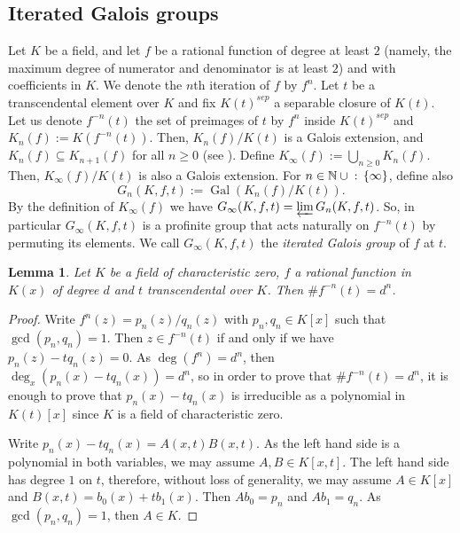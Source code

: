 \documentclass{amsart}
\def\set#1{{\def\st{\;:\;}\left\{#1\right\}}}
\def\NN{\mathbb N}
\DeclareMathOperator{\Gal}{Gal}
\DeclareMathOperator{\st}{st}
\newtheorem{Lemma}[Proposition]{Lemma}
\begin{document}
\subsection{Iterated Galois groups}
\label{subsection: The galois of iterated rational functions}

Let $K$ be a field, and let $f$ be a rational function of degree at least $2$ (namely, the maximum degree of numerator and denominator is at least $2$) and with coefficients in $K$. We denote the $n$th iteration of $f$ by $f^n$. Let $t$ be a transcendental element over $K$ and fix $K(t)^{sep}$ a separable closure of $K(t)$. Let us denote $f^{-n}(t)$ the set of preimages of $t$ by $f^n$ inside $K(t)^{sep}$ and $K_n(f) := K(f^{-n}(t))$. Then, $K_n(f)/K(t)$ is a Galois extension, and $K_n(f) \subseteq K_{n+1}(f)$ for all $n \geq 0$ (see \cite{Jones2014}). Define $K_\infty(f) := \bigcup_{n \geq 0} K_n(f)$. Then, $K_\infty(f)/K(t)$ is also a Galois extension. For $n \in \NN \cup \set{\infty}$, define also $$G_n(K,f,t) := \Gal(K_n(f)/K(t)).$$ By the definition of $K_\infty(f)$ we have $G_\infty(K,f,t) = \varprojlim G_n(K,f,t)$. So, in particular $G_\infty(K,f,t)$ is a profinite group that acts naturally on $f^{-n}(t)$ by permuting its elements. We call $G_\infty(K,f,t)$ the \textit{iterated Galois group} of $f$ at $t$.

\begin{Lemma}
Let $K$ be a field of characteristic zero, $f$ a rational function in $K(x)$ of degree $d$ and $t$ transcendental over $K$. Then $\# f^{-n}(t) = d^n$.
\label{lemma: t transcendental d^n preimages}
\end{Lemma}

\begin{proof}
Write $f^n(z) = p_n(z)/q_n(z)$ with $p_n,q_n \in K[x]$ such that $\gcd(p_n,q_n) = 1$. Then $z \in f^{-n}(t)$ if and only if we have $p_n(z) - t q_n(z) = 0$. As $\deg(f^n) = d^n$, then $\deg_x(p_n(x) - t q_n(x)) = d^n$, so in order to prove that $\# f^{-n}(t) = d^n$, it is enough to prove that $p_n(x) - t q_n(x)$ is irreducible as a polynomial in $K(t)[x]$ since $K$ is a field of characteristic zero. 

Write $p_n(x) - t q_n(x) = A(x,t) B(x,t)$. As the left hand side is a polynomial in both variables, we may assume $A,B \in K[x,t]$. The left hand side has degree $1$ on $t$, therefore, without loss of generality, we may assume $A \in K[x]$ and $B(x,t) = b_0(x) + tb_1(x)$. Then $Ab_0 = p_n$ and $Ab_1 = q_n$. As $\gcd(p_n, q_n) = 1$, then $A \in K$. 
\end{proof}
\end{document}
